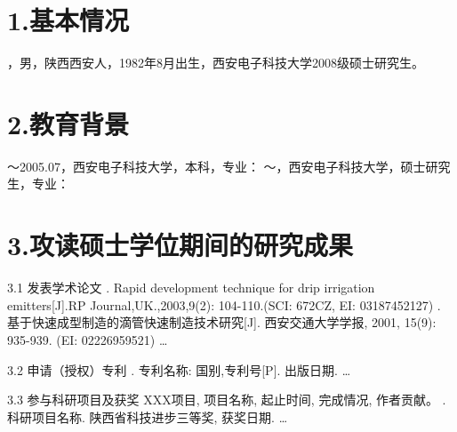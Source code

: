 \begin{resume}
\section*{1.\hspace{0.75em}基本情况}
，男，陕西西安人，1982年8月出生，西安电子科技大学2008级硕士研究生。
\section*{2.\hspace{0.75em}教育背景}
\begin{resumelist*}
～2005.07，西安电子科技大学，本科，专业：
～\phantom{2005.07}，西安电子科技大学，硕士研究生，专业：
\end{resumelist*}
\section*{3.\hspace{0.75em}攻读硕士学位期间的研究成果}
\begin{resumelist}{\hspace{-0.25em}3.1\hspace{0.5em} 发表学术论文}
\resumelistitem {}. Rapid development technique for drip irrigation emitters[J].RP Journal,UK.,2003,9(2): 104-110.(SCI: 672CZ, EI: 03187452127)
\resumelistitem {}. 基于快速成型制造的滴管快速制造技术研究[J]. 西安交通大学学报, 2001, 15(9): 935-939. (EI: 02226959521)
\resumelistitem \ldots
\end{resumelist}
\begin{resumelist}{\hspace{-0.25em}3.2\hspace{0.5em} 申请（授权）专利}
\resumelistitem {}. 专利名称: 国别,专利号[P]. 出版日期.
\resumelistitem \ldots
\end{resumelist}
\begin{resumelist}{\hspace{-0.25em}3.3\hspace{0.5em} 参与科研项目及获奖}
\resumelistitem XXX项目, 项目名称, 起止时间, 完成情况, 作者贡献。
\resumelistitem {}. 科研项目名称. 陕西省科技进步三等奖, 获奖日期.
\resumelistitem \ldots
\end{resumelist}
\end{resume}
